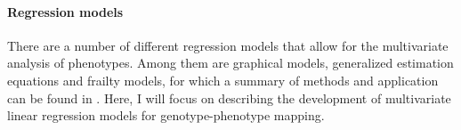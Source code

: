 
\paragraph{Regression models} There are a number of different regression models that allow for the multivariate analysis of phenotypes. Among them are graphical models, generalized estimation equations and frailty models, for which a summary of methods and application can be found in \citep{Shriner2012,Yang2012b}. Here, I will focus on describing the development of multivariate linear regression models for genotype-phenotype mapping. 

